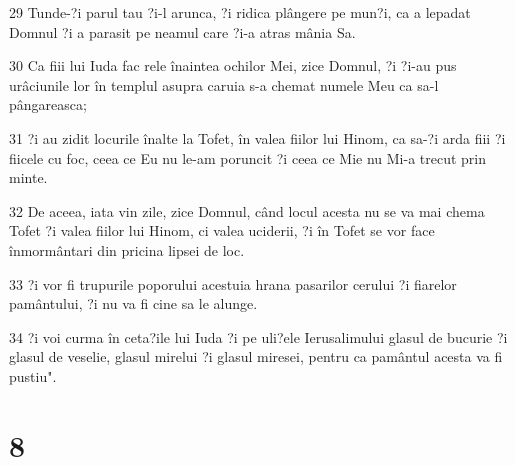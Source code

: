 \par 29 Tunde-?i parul tau ?i-l arunca, ?i ridica plângere pe mun?i, ca a lepadat Domnul ?i a parasit pe neamul care ?i-a atras mânia Sa.
\par 30 Ca fiii lui Iuda fac rele înaintea ochilor Mei, zice Domnul, ?i ?i-au pus urâciunile lor în templul asupra caruia s-a chemat numele Meu ca sa-l pângareasca;
\par 31 ?i au zidit locurile înalte la Tofet, în valea fiilor lui Hinom, ca sa-?i arda fiii ?i fiicele cu foc, ceea ce Eu nu le-am poruncit ?i ceea ce Mie nu Mi-a trecut prin minte.
\par 32 De aceea, iata vin zile, zice Domnul, când locul acesta nu se va mai chema Tofet ?i valea fiilor lui Hinom, ci valea uciderii, ?i în Tofet se vor face înmormântari din pricina lipsei de loc.
\par 33 ?i vor fi trupurile poporului acestuia hrana pasarilor cerului ?i fiarelor pamântului, ?i nu va fi cine sa le alunge.
\par 34 ?i voi curma în ceta?ile lui Iuda ?i pe uli?ele Ierusalimului glasul de bucurie ?i glasul de veselie, glasul mirelui ?i glasul miresei, pentru ca pamântul acesta va fi pustiu".

\chapter{8}


